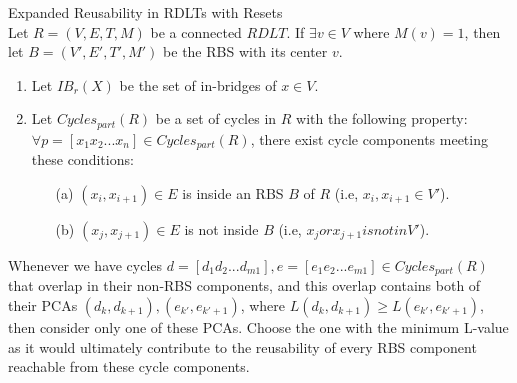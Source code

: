 \begin{defn} Expanded Reusability in RDLTs with Resets \\
Let $R =  (V, E, T, M)$ be a connected $RDLT$. If $\exists v \in V$ where $M(v)=1$, then let $B =  (V', E', T', M')$ be the RBS with its center $v$.
\begin{enumerate}
    \item Let $IB_r(X)$ be the set of in-bridges of $x \in V$.
    \item Let $Cycles_{part}(R)$ be a set of cycles in $R$ with the following property: $\forall p = [x_1 x_2 ... x_n] \in Cycles_{part}(R)$, there exist cycle components meeting these conditions:
    \begin{itemize}
        \item [(a)] $(x_i,x_{i+1}) \in E$ is inside an RBS $B$ of $R$ (i.e, $x_i,x_{i+1} \in V'$).
        \item [(b)] $(x_j,x_{j+1}) \in E$ is not inside $B$ (i.e, $x_j or x_{j+1} is not in V'$).
    \end{itemize}
\end{enumerate}
Whenever we have cycles $d = [d_1 d_2 ... d_{m1}], e = [e_1 e_2 ... e_{m1}] \in Cycles_{part}(R)$ that overlap in their non-RBS components, and this overlap contains both of their PCAs $(d_k,d_{k+1}), (e_{k'},e_{k'+1})$, where $L(d_k,d_{k+1}) \geq L(e_{k'},e_{k'+1})$, then consider only one of these PCAs. Choose the one with the minimum L-value as it would ultimately contribute to the reusability of every RBS component reachable from these cycle components.
\end{defn}

